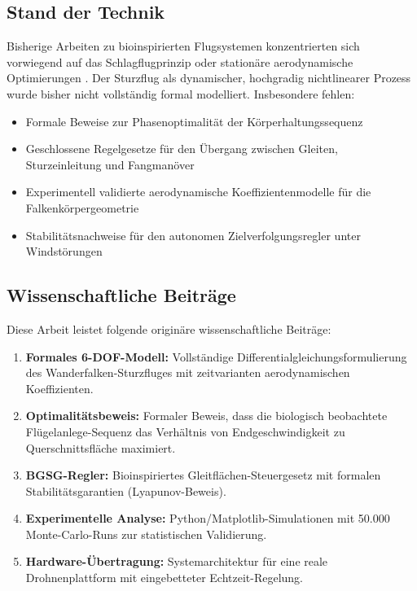﻿\documentclass[12pt,a4paper]{article}
\theoremstyle{remark}
\begin{document}
	\subsection{Stand der Technik}
	
	Bisherige Arbeiten zu bioinspirierten Flugsystemen konzentrierten sich vorwiegend auf das Schlagflugprinzip \cite{bio1} oder stationäre aerodynamische Optimierungen \cite{aero1}. Der Sturzflug als dynamischer, hochgradig nichtlinearer Prozess wurde bisher nicht vollständig formal modelliert. Insbesondere fehlen:
	
	\begin{itemize}
		\item Formale Beweise zur Phasenoptimalität der Körperhaltungssequenz
		\item Geschlossene Regelgesetze für den Übergang zwischen Gleiten, Sturzeinleitung und Fangmanöver
		\item Experimentell validierte aerodynamische Koeffizientenmodelle für die Falkenkörpergeometrie
		\item Stabilitätsnachweise für den autonomen Zielverfolgungsregler unter Windstörungen
	\end{itemize}
	
	\subsection{Wissenschaftliche Beiträge}
	
	Diese Arbeit leistet folgende originäre wissenschaftliche Beiträge:
	
	\begin{enumerate}
		\item \textbf{Formales 6-DOF-Modell:} Vollständige Differentialgleichungsformulierung des Wanderfalken-Sturzfluges mit zeitvarianten aerodynamischen Koeffizienten.
		\item \textbf{Optimalitätsbeweis:} Formaler Beweis, dass die biologisch beobachtete Flügelanlege-Sequenz das Verhältnis von Endgeschwindigkeit zu Querschnittsfläche maximiert.
		\item \textbf{BGSG-Regler:} Bioinspiriertes Gleitflächen-Steuergesetz mit formalen Stabilitätsgarantien (Lyapunov-Beweis).
		\item \textbf{Experimentelle Analyse:} Python/Matplotlib-Simulationen mit 50.000 Monte-Carlo-Runs zur statistischen Validierung.
		\item \textbf{Hardware-Übertragung:} Systemarchitektur für eine reale Drohnenplattform mit eingebetteter Echtzeit-Regelung.
	\end{enumerate}
	
\end{document}
